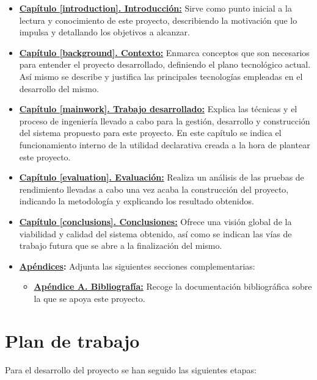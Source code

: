\begin{itemize}
	\item \textbf{\hyperlink{introduccion}{Capítulo \ref*{introduction}. Introducción:}} Sirve como punto inicial a la lectura y conocimiento de este proyecto, describiendo la motivación que lo impulsa y detallando los objetivos a alcanzar.
	\item \textbf{\hyperlink{background}{Capítulo \ref*{background}. Contexto:}} Enmarca conceptos que son necesarios para entender el proyecto desarrollado, definiendo el plano tecnológico actual. Así mismo se describe y justifica las principales tecnologías empleadas en el desarrollo del mismo.
	\item \textbf{\hyperlink{mainwork}{Capítulo \ref*{mainwork}. Trabajo desarrollado:}} Explica las técnicas y el proceso de ingeniería llevado a cabo para la gestión, desarrollo y construcción del sistema propuesto para este proyecto. En este capítulo se indica el funcionamiento interno de la utilidad declarativa creada a la hora de plantear este proyecto.
	\item \textbf{\hyperlink{evaluation}{Capítulo \ref*{evaluation}. Evaluación:}} Realiza un análisis de las pruebas de rendimiento llevadas a cabo una vez acaba la construcción del proyecto, indicando la metodología y explicando los resultado obtenidos.
	\item \textbf{\hyperlink{conclusions}{Capítulo \ref*{conclusions}. Conclusiones:}} Ofrece una visión global de la viabilidad y calidad del sistema obtenido, así como se indican las vías de trabajo futura que se abre a la finalización del mismo.
	\item \textbf{\hyperlink{appendices}{Apéndices}:} Adjunta las siguientes secciones complementarias:
	\begin{itemize}
		\item \textbf{\hyperlink{bibliography}{Apéndice A. Bibliografía:}} Recoge la documentación bibliográfica sobre la que se apoya este proyecto.
	\end{itemize}
\end{itemize}

\section{Plan de trabajo}

Para el desarrollo del proyecto se han seguido las siguientes etapas:

